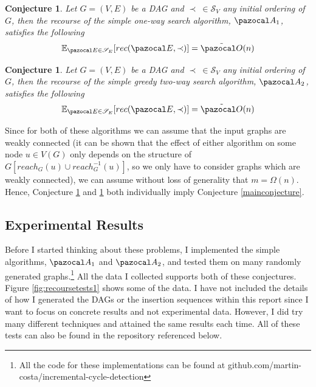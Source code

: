 \documentclass{report}
\newtheorem{conjecture}[theorem]{Conjecture}
\begin{document}
\begin{conjecture}\label{A1conjecture}
Let $G=(V,E)$ be a DAG and $\prec \: \in \mathcal S_V$ any initial ordering of $G$, then the recourse of the simple one-way search algorithm, $\pazocal A_1$, satisfies the following
\[ \mathbb E_{\pazocal E \in \mathcal S_E}[rec(\pazocal E, \prec)] = \tilde{\pazocal O}(n) \]
\end{conjecture}

\begin{conjecture}\label{A2conjecture}
Let $G=(V,E)$ be a DAG and $\prec \: \in \mathcal S_V$ any initial ordering of $G$, then the recourse of the simple greedy two-way search algorithm, $\pazocal A_2$, satisfies the following
\[ \mathbb E_{\pazocal E \in \mathcal S_E}[rec(\pazocal E, \prec)] = \tilde{\pazocal O}(n) \]
\end{conjecture}

Since for both of these algorithms we can assume that the input graphs are weakly connected (it can be shown that the effect of either algorithm on some node $u \in V(G)$ only depends on the structure of $G[reach_G(u) \cup reach^{-1}_G(u)]$, so we only have to consider graphs which are weakly connected), we can assume without loss of generality that $m=\Omega(n)$. Hence, Conjecture \ref{A1conjecture} and \ref{A2conjecture} both individually imply Conjecture \ref{mainconjecture}.

\subsection{Experimental Results}\label{simplealgotests}

Before I started thinking about these problems, I implemented the simple algorithms, $\pazocal A_1$ and $\pazocal A_2$, and tested them on many randomly generated graphs.\footnote{All the code for these implementations can be found at github.com/martin-costa/incremental-cycle-detection} All the data I collected supports both of these conjectures. Figure \ref{fig:recoursetests1} shows some of the data. I have not included the details of how I generated the DAGs or the insertion sequences within this report since I want to focus on concrete results and not experimental data. However, I did try many different techniques and attained the same results each time. All of these tests can also be found in the repository referenced below.
\end{document}
